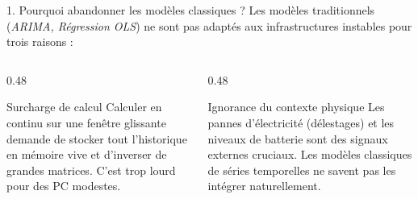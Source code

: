 \documentclass[10pt,aspectratio=169]{beamer}
\begin{document}
\begin{frame}{1. Pourquoi abandonner les modèles classiques ?}
  Les modèles traditionnels (\textit{ARIMA, Régression OLS}) ne sont pas adaptés aux infrastructures instables pour trois raisons :
  
  \vspace{0.5em}
  \begin{columns}[T]
    \begin{column}{0.48\textwidth}
      \begin{alertblock}{Surcharge de calcul}
        Calculer en continu sur une fenêtre glissante demande de stocker tout l'historique en mémoire vive et d'inverser de grandes matrices. C'est trop lourd pour des PC modestes.
      \end{alertblock}
    \end{column}
    
    \begin{column}{0.48\textwidth}
      \begin{alertblock}{Ignorance du contexte physique}
        Les pannes d'électricité (délestages) et les niveaux de batterie sont des signaux externes cruciaux. Les modèles classiques de séries temporelles ne savent pas les intégrer naturellement.
      \end{alertblock}
    \end{column}
  \end{columns}
\end{frame}
\end{document}
